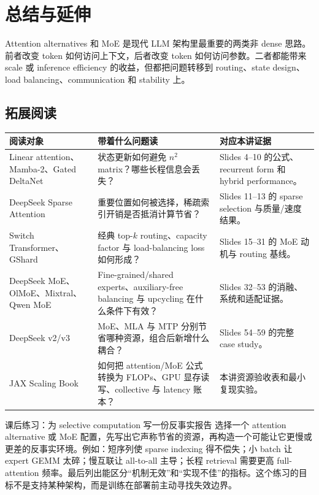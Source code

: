 \documentclass[a4paper]{article}
\begin{document}
\section{总结与延伸}
Attention alternatives 和 MoE 是现代 LLM 架构里最重要的两类非 dense 思路。前者改变 token 如何访问上下文，后者改变 token 如何访问参数。二者都能带来 scale 或 inference efficiency 的收益，但都把问题转移到 routing、state design、load balancing、communication 和 stability 上。
\subsection{拓展阅读}
\begin{longtable}{p{}p{}p{}}
\toprule
阅读对象 & 带着什么问题读 & 对应本讲证据 \\
\midrule
Linear attention、Mamba-2、Gated DeltaNet & 状态更新如何避免 $n^2$ matrix？哪些长程信息会丢失？ & Slides 4--10 的公式、recurrent form 和 hybrid performance。 \\
DeepSeek Sparse Attention & 重要位置如何被选择，稀疏索引开销是否抵消计算节省？ & Slides 11--13 的 sparse selection 与质量/速度结果。 \\
Switch Transformer、GShard & 经典 top-$k$ routing、capacity factor 与 load-balancing loss 如何形成？ & Slides 15--31 的 MoE 动机与 routing 基线。 \\
DeepSeek MoE、OlMoE、Mixtral、Qwen MoE & Fine-grained/shared experts、auxiliary-free balancing 与 upcycling 在什么条件下有效？ & Slides 32--53 的消融、系统和适配证据。 \\
DeepSeek v2/v3 & MoE、MLA 与 MTP 分别节省哪种资源，组合后新增什么耦合？ & Slides 54--59 的完整 case study。 \\
JAX Scaling Book & 如何把 attention/MoE 公式转换为 FLOPs、GPU 显存读写、collective 与 latency 账本？ & 本讲资源验收表和最小复现实验。 \\
\bottomrule
\end{longtable}

\begin{importantbox}{课后练习：为 selective computation 写一份反事实报告}
选择一个 attention alternative 或 MoE 配置，先写出它声称节省的资源，再构造一个可能让它更慢或更差的反事实环境。例如：短序列使 sparse indexing 得不偿失；小 batch 让 expert GEMM 太碎；慢互联让 all-to-all 主导；长程 retrieval 需要更高 full-attention 频率。最后列出能区分“机制无效”和“实现不佳”的指标。这个练习的目标不是支持某种架构，而是训练在部署前主动寻找失效边界。
\end{importantbox}
\end{document}
